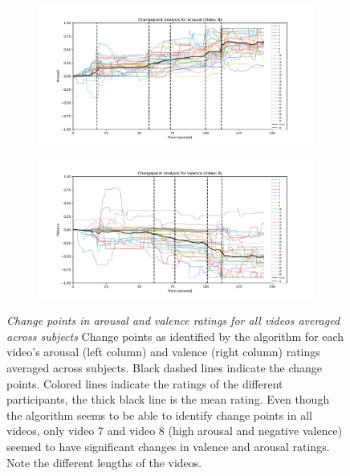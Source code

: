 \documentclass[11pt, letterpaper]{article}
\begin{document}
\begin{figure}
        \centering
    \begin{subfigure}[t]{0.49\textwidth}
        \centering
        \includegraphics[width=\linewidth]{changepoints_V8_arousal_avg_all_data} 
        \caption{} \label{fig:changepoints_V8_arousal_avg_all_data}
    \end{subfigure}
    \hfill
    \begin{subfigure}[t]{0.49\textwidth}
        \centering
        \includegraphics[width=\linewidth]{changepoints_V8_valence_avg_all_data} 
        \caption{} \label{fig:changepoints_V8_valence_avg_all_data}
    \end{subfigure}
    
    \caption{\textit{Change points in arousal and valence ratings for all videos averaged across subjects} Change points as identified by the algorithm for each video's arousal (left column) and valence (right column) ratings averaged across subjects. Black dashed lines indicate the change points. Colored lines indicate the ratings of the different participants, the thick black line is the mean rating. Even though the algorithm seems to be able to identify change points in all videos, only video 7 and video 8 (high arousal and negative valence) seemed to have significant changes in valence and arousal ratings. Note the different lengths of the videos.}
    \label{fig:all_data}
\end{figure}
\end{document}
